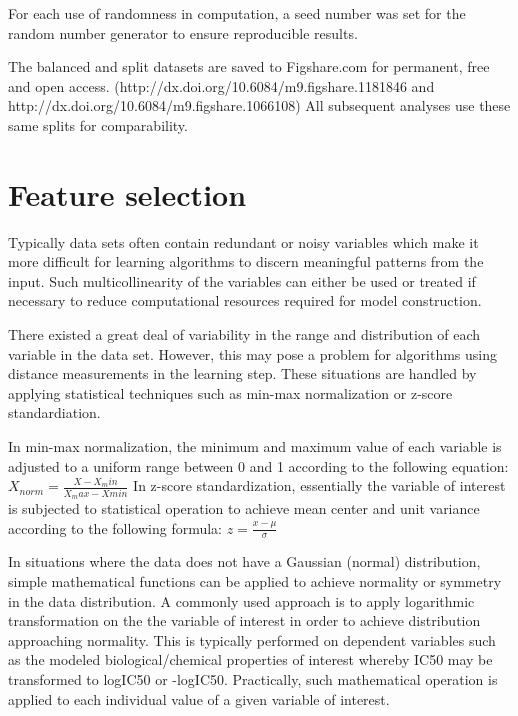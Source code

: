 For each use of randomness in computation, a seed number was set for the random number generator to ensure reproducible results.  

The balanced and split datasets are saved to Figshare.com for permanent, free and open access. (http://dx.doi.org/10.6084/m9.figshare.1181846 and http://dx.doi.org/10.6084/m9.figshare.1066108) All subsequent analyses use these same splits for comparability.

\section{Feature selection}

Typically data sets often contain redundant or noisy variables which make it more difficult for learning algorithms to discern meaningful patterns from the input. Such multicollinearity of the variables can either be used or treated if necessary to reduce computational resources required for model construction. \cite{Nantasenamat2009}

There existed a great deal of variability in the range and distribution of each variable in the data set. However, this may pose a problem for algorithms using distance measurements in the learning step. These situations are handled by applying statistical techniques such as min-max normalization or z-score standardiation. 

In min-max normalization, the minimum and maximum value of each variable is adjusted to a uniform range between 0 and 1 according to the following equation: $ X_{norm} = \frac{X - X_min}{X_max - Xmin}  $ In z-score standardization, essentially the variable of interest is subjected to statistical operation to achieve mean center and unit variance according to the following formula: $ z = \frac{x - \mu}{\sigma}  $ \cite{Nantasenamat2009}

In situations where the data does not have a Gaussian (normal) distribution, simple mathematical functions can be applied to achieve normality or symmetry in the data distribution. A commonly used approach is to apply logarithmic transformation on the the variable of interest in order to achieve distribution approaching normality. This is typically performed on dependent variables such as the modeled biological/chemical properties of interest whereby IC50 may be transformed to logIC50 or -logIC50. Practically, such mathematical operation is applied to each individual value of a given variable of interest. \cite{Nantasenamat2009}



